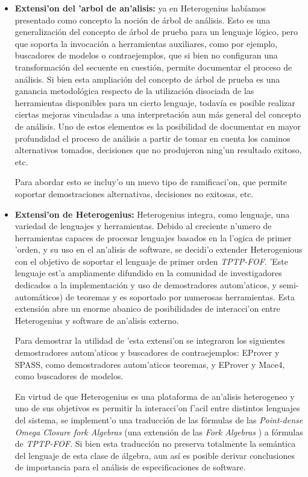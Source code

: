 \begin{itemize}
\item \textbf{Extensi'on del 'arbol de an'alisis:} ya en Heterogenius habíamos presentado como concepto la noción de árbol de análisis. Esto es una generalización del concepto de árbol de prueba para un lenguaje lógico, pero que soporta la invocación a herramientas auxiliares, como por ejemplo, buscadores de modelos o contraejemplos, que si bien no configuran una transformación del secuente en cuestión, permite documentar el proceso de análisis. Si bien esta ampliación del concepto de árbol de prueba es una ganancia metodológica respecto de la utilización disociada de las herramientas disponibles para un cierto lenguaje, todavía es posible realizar ciertas mejoras vinculadas a una interpretación aun más general del concepto de análisis. Uno de estos elementos es la posibilidad de documentar en mayor profundidad el proceso de análisis a partir de tomar en cuenta los caminos alternativos tomados, decisiones que no produjeron ning'un resultado exitoso, etc.

Para abordar esto se incluy'o un nuevo tipo de ramificaci'on, que permite soportar demostraciones alternativas, decisiones no exitosas, etc.

\item \textbf{Extensi'on de Heterogenius:} Heterogenius integra, como lenguaje, una variedad de lenguajes y herramientas. Debido al creciente n'umero de herramientas capaces de procesar lenguajes basados en la l'ogica de primer 'orden, y su uso en el an'alisis de software, se decidi'o extender Heterogenious con el objetivo de soportar el lenguaje de primer orden \textit{TPTP-FOF}. 'Este lenguaje est'a ampliamente difundido en la comunidad de investigadores dedicados a la implementación y uso de demostradores autom'aticos, y semi-automáticos) de teoremas y es soportado por numerosas herramientas. Esta extensión abre un enorme abanico de posibilidades de interacci'on entre Heterogenius y software de an'alisis externo. 

Para demostrar la utilidad de 'esta extensi'on se integraron los siguientes demostradores autom'aticos y buscadores de contraejemplos: EProver y SPASS, como demostradores autom'aticos teoremas, y EProver y Mace4, como buscadores de modelos. 

En virtud de que Heterogenius es una plataforma de an'alisis heterogeneo y uno de sus objetivos es permitir la interacci'on f'acil entre distintos lenguajes del sistema, se implement'o una traducción de las fórmulas de las \emph{Point-dense Omega Closure fork Algebras} \cite{lopezpombo:LF06} (una extensión de las \emph{Fork Algebras} \cite{frias02}) a fórmulas de \textit{TPTP-FOF}. Si bien esta traducción no preserva totalmente la semántica del lenguaje de esta clase de álgebra, aun así es posible derivar conclusiones de importancia para el análisis de especificaciones de software.



\end{itemize}
